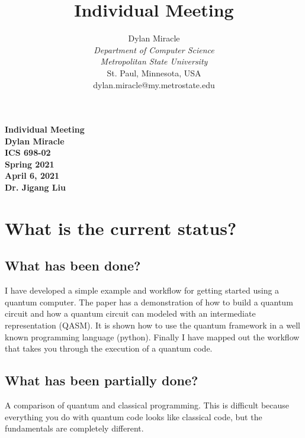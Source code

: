 \documentclass{article}
\begin{document}
\begin{titlepage}
    \begin{center}
        \vspace{4cm}
        \large
        \textbf{
            Individual Meeting \\
            Dylan Miracle \\
            ICS 698-02 \\
            Spring 2021 \\
            April 6, 2021 \\
            Dr. Jigang Liu
        }
    \end{center}
\end{titlepage}
\title{Individual Meeting}

\author{Dylan Miracle\\
\textit{Department of Computer Science} \\
\textit{Metropolitan State University}\\
St. Paul, Minnesota, USA \\
dylan.miracle@my.metrostate.edu
}

\maketitle

\tableofcontents

\section{What is the current status?}
\subsection{What has been done?}
I have developed a simple example and workflow for getting started using a quantum computer. The paper has a demonstration of how to build a quantum circuit and how a quantum circuit can modeled with an intermediate representation (QASM). It is shown how to use the quantum framework in a well known programming language (python). Finally I have mapped out the workflow that takes you through the execution of a quantum code.

\subsection{What has been partially done?}
A comparison of quantum and classical programming. This is difficult because everything you do with quantum code looks like classical code, but the fundamentals are completely different. 
\end{document}
